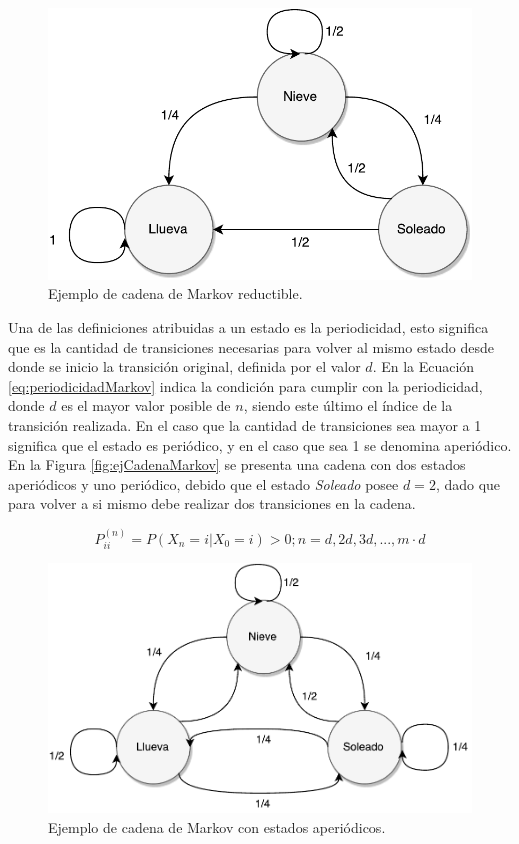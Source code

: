 \begin{figure}[ht!]
	\centering
	\includegraphics[scale=0.5]{images/EjCadenaMarkov-Reductible.pdf}
	\caption{Ejemplo de cadena de Markov reductible.}
	\label{fig:ejCadenaMarkov-Reductible}
\end{figure}

\normalsize{Una de las definiciones atribuidas a un estado es la periodicidad, esto significa que es la cantidad de transiciones necesarias para volver al mismo estado desde donde se inicio la transición original, definida por el valor $d$. En la Ecuación} \ref{eq:periodicidadMarkov} \normalsize{indica la condición para cumplir con la periodicidad, donde $d$ es el mayor valor posible de $n$, siendo este último el índice de la transición realizada. En el caso que la cantidad de transiciones sea mayor a 1 significa que el estado es periódico, y en el caso que sea 1 se denomina aperiódico. En la Figura} \ref{fig:ejCadenaMarkov} \normalsize{se presenta una cadena con dos estados aperiódicos y uno periódico, debido que el estado \textit{Soleado} posee $d=2$, dado que para volver a si mismo debe realizar dos transiciones en la cadena.}

\begin{equation} \label{eq:periodicidadMarkov}
	P_{ii}^{(n)} = P(X_n = i | X_0 = i) > 0 ; n = {d,2d,3d,..., m·d}
\end{equation}

\begin{figure}[ht!]
	\centering
	\includegraphics[scale=0.5]{images/EjCadenaMarkov-Aperiodica.pdf}
	\caption{Ejemplo de cadena de Markov con estados aperiódicos.}
	\label{fig:ejCadenaMarkov-Aperiodica}
\end{figure}

